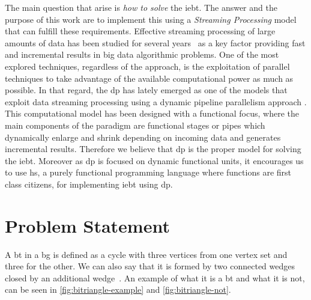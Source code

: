 The main question that arise is \emph{how to solve} the \acrshort{iebt}. The answer and the purpose of this work are to implement this using a \emph{Streaming Processing} model that can fulfill these requirements.
Effective streaming processing of large amounts of data has been studied for several years~\cite{enumeratingsg, exploiting, onthefly} as a key factor providing fast and incremental results in big data algorithmic problems. 
One of the most explored techniques, regardless of the approach, is the exploitation of parallel techniques to take advantage of the available computational power as much as possible. 
In that regard, the \acrfull{dp} \cite{dpdef} has lately emerged as one of the models that exploit data streaming processing using a dynamic pipeline parallelism approach \cite{onthefly}. 
This computational model has been designed with a functional focus, where the main components of the paradigm are functional stages or pipes which dynamically enlarge and shrink depending on incoming data and generates incremental results.  
Therefore we believe that \acrshort{dp} is the proper model for solving the \acrshort{iebt}. Moreover as \acrshort{dp} is focused on dynamic functional units, it encourages us to use \acrlong{hs}, a purely functional programming language where functions are first class citizens, for implementing \acrshort{iebt} using \acrshort{dp}.



\section{Problem Statement}
A \acrlong{bt} in a \acrlong{bg} is defined as a cycle with three vertices from one vertex set and three for the other. We can also say that it is formed by two connected wedges closed by an additional wedge~\cite{btcount}.
An example of what it is a \acrshort{bt} and what it is not, can be seen in \autoref{fig:bitriangle-example} and \autoref{fig:bitriangle-not}.

